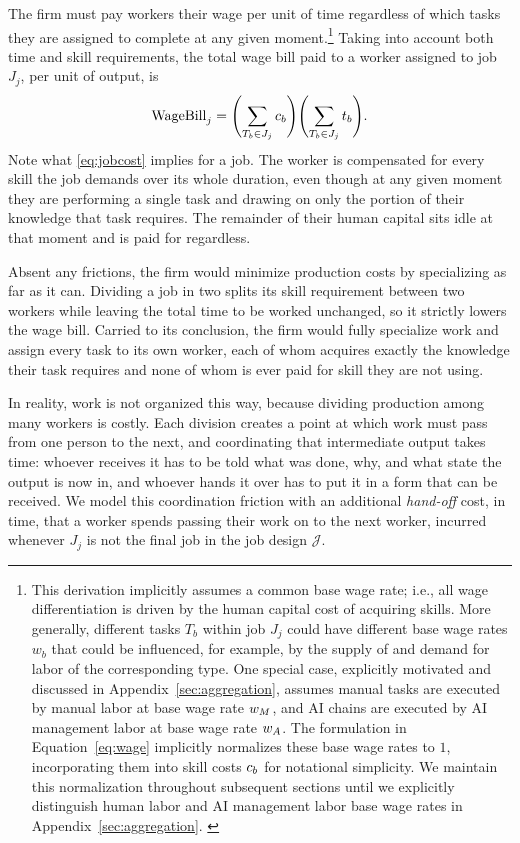 The firm must pay workers their wage per unit of time regardless of which tasks they are assigned to complete at any given moment.\footnote{
This derivation implicitly assumes a common base wage rate; i.e., all wage differentiation is driven by the human capital cost of acquiring skills.
More generally, different tasks $T_b$ within job $J_j$ could have different base wage rates $w_b$ that could be influenced, for example, by the supply of and demand for labor of the corresponding type.
One special case, explicitly motivated and discussed in Appendix~\ref{sec:aggregation}, assumes manual tasks are executed by manual labor at base wage rate $w_{M}$, and AI chains are executed by AI management labor at base wage rate $w_{A}$.
The formulation in Equation~\eqref{eq:wage} implicitly normalizes these base wage rates to $1$, incorporating them into skill costs $c_{b}$ for notational simplicity.
We maintain this normalization throughout subsequent sections until we explicitly distinguish human labor and AI management labor base wage rates in Appendix~\ref{sec:aggregation}.
\label{foot:wage}
}
Taking into account both time and skill requirements, the total wage bill paid to a worker assigned to job $J_j$, per unit of output, is
\begin{align}
\label{eq:jobcost}
\text{WageBill}_j = \Biggl(\sum_{T_b \in J_j} c_{b} \Biggr)\Biggl(\sum_{T_b \in J_j} t_{b} \Biggr).
\end{align}
Note what \eqref{eq:jobcost} implies for a job.
The worker is compensated for every skill the job demands over its whole duration, even though at any given moment they are performing a single task and drawing on only the portion of their knowledge that task requires.
The remainder of their human capital sits idle at that moment and is paid for regardless.

Absent any frictions, the firm would minimize production costs by specializing as far as it can.
Dividing a job in two splits its skill requirement between two workers while leaving the total time to be worked unchanged, so it strictly lowers the wage bill.
Carried to its conclusion, the firm would fully specialize work and assign every task to its own worker, each of whom acquires exactly the knowledge their task requires and none of whom is ever paid for skill they are not using.

In reality, work is not organized this way, because dividing production among many workers is costly.
Each division creates a point at which work must pass from one person to the next, and coordinating that intermediate output takes time: whoever receives it has to be told what was done, why, and what state the output is now in, and whoever hands it over has to put it in a form that can be received.
We model this coordination friction with an additional \emph{hand-off} cost, in time, that a worker spends passing their work on to the next worker, incurred whenever $J_j$ is not the final job in the job design $\mathcal{J}$.

